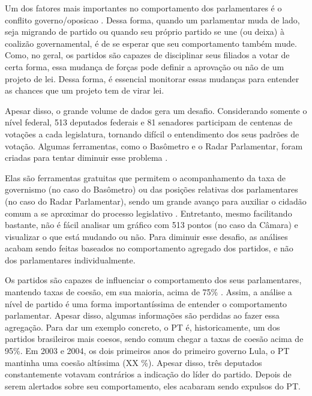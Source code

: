 Um dos fatores mais importantes no comportamento dos parlamentares é o conflito
governo/oposicao \cite{Leoni2002,Desposato2005b,Freitas2012,Izumi2013}. Dessa
forma, quando um parlamentar muda de lado, seja migrando de partido ou quando
seu próprio partido se une (ou deixa) à coalizão governamental, é de se esperar
que seu comportamento também mude. Como, no geral, os partidos são capazes de
disciplinar seus filiados a votar de certa forma, essa mudança de forças pode
definir a aprovação ou não de um projeto de lei. Dessa forma, é essencial
monitorar essas mudanças para entender as chances que um projeto tem de virar
lei.

Apesar disso, o grande volume de dados gera um desafio. Considerando somente o
nível federal, 513 deputados federais e 81 senadores participam de centenas de
votações a cada legislatura, tornando difícil o entendimento dos seus padrões
de votação. Algumas ferramentas, como o Basômetro e o Radar Parlamentar, foram
criadas para tentar diminuir esse problema \cite{Estadao2012,Trento2013}.

Elas são ferramentas gratuitas que permitem o acompanhamento da taxa de
governismo (no caso do Basômetro) ou das posições relativas dos parlamentares
(no caso do Radar Parlamentar), sendo um grande avanço para auxiliar o cidadão
comum a se aproximar do processo legislativo \cite{Dantas2014}. Entretanto,
mesmo facilitando bastante, não é fácil analisar um gráfico com 513 pontos (no
caso da Câmara) e visualizar o que está mudando ou não. Para diminuir esse
desafio, as análises acabam sendo feitas baseados no comportamento agregado dos
partidos, e não dos parlamentares individualmente.

Os partidos são capazes de influenciar o comportamento dos seus parlamentares,
mantendo taxas de coesão, em sua maioria, acima de 75\%
\cite{Figueiredo2001,Cheibub2009,Zucco2009}. Assim, a análise a nível de partido
é uma forma importantíssima de entender o comportamento parlamentar. Apesar
disso, algumas informações são perdidas ao fazer essa agregação. Para dar um
exemplo concreto, o PT é, historicamente, um dos partidos brasileiros mais
coesos, sendo comum chegar a taxas de coesão acima de 95\%. Em 2003 e 2004, os
dois primeiros anos do primeiro governo Lula, o PT mantinha uma coesão
altíssima (XX \%). Apesar disso, três deputados constantemente votavam
contrários a indicação do líder do partido. Depois de serem alertados sobre seu
comportamento, eles acabaram sendo expulsos do PT.

